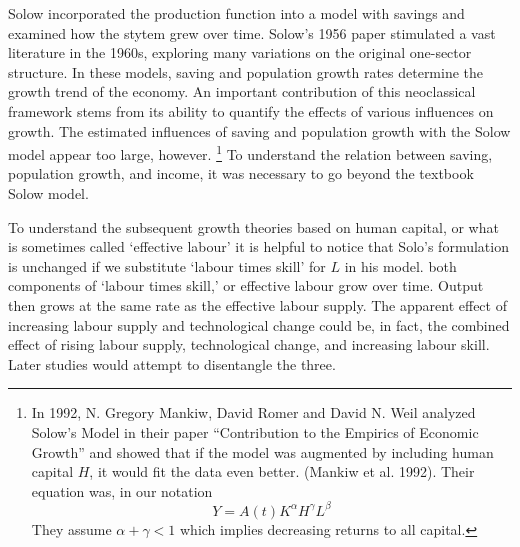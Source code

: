 Solow incorporated the production function into a model with savings and examined how the stytem grew over time. Solow's 1956 paper stimulated a vast literature in the 1960s, exploring many variations on the original one-sector structure. %
In these models, saving and population growth rates determine the growth trend of the economy. An important  contribution of this neoclassical framework stems from its ability to quantify the effects of various influences on growth. The estimated influences of saving and population growth with the Solow model appear too large, however.%
\footnote{In 1992, N. Gregory Mankiw, David Romer %
and David N. Weil analyzed Solow’s Model in their paper “Contribution to the Empirics of Economic Growth” and  showed that %
if the model was augmented by including human capital $H$, it would fit the data even better.   (Mankiw et al. 1992). Their equation was, in our notation   
\begin{equation*}
Y=A(t)K^\alpha H^\gamma L^\beta 
\end{equation*}
 They assume $\alpha+\gamma<1$ which implies decreasing returns to all capital.} 
To understand the relation between saving, population growth, and income, it was necessary to go beyond the textbook Solow model.%

To understand the subsequent growth theories based on human capital, or what is sometimes called `effective labour' it is helpful to notice that Solo's formulation is unchanged if we substitute `labour times  skill' for $L$ in his model. both components of `labour times  skill,' or effective labour grow over time. Output then grows at the same rate as the effective labour supply. The apparent effect of increasing labour supply and technological change could be, in fact, the combined effect of rising labour supply, technological change, and increasing labour skill. Later studies would attempt to disentangle the three.


